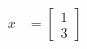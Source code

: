 \documentclass{minimal}
\begin{document}
\begin{align}
    x &= \begin{bmatrix} 1 \\ 3 \end{bmatrix}
\end{align}
\end{document}
